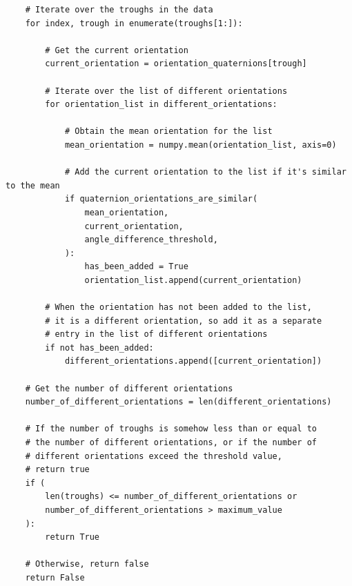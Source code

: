 \documentclass[12pt]{report}
\begin{document}
\begin{verbatim}
    # Iterate over the troughs in the data
    for index, trough in enumerate(troughs[1:]):

        # Get the current orientation
        current_orientation = orientation_quaternions[trough]

        # Iterate over the list of different orientations
        for orientation_list in different_orientations:

            # Obtain the mean orientation for the list
            mean_orientation = numpy.mean(orientation_list, axis=0)

            # Add the current orientation to the list if it's similar to the mean
            if quaternion_orientations_are_similar(
                mean_orientation,
                current_orientation,
                angle_difference_threshold,
            ):
                has_been_added = True
                orientation_list.append(current_orientation)

        # When the orientation has not been added to the list,
        # it is a different orientation, so add it as a separate
        # entry in the list of different orientations
        if not has_been_added:
            different_orientations.append([current_orientation])

    # Get the number of different orientations
    number_of_different_orientations = len(different_orientations)

    # If the number of troughs is somehow less than or equal to
    # the number of different orientations, or if the number of
    # different orientations exceed the threshold value,
    # return true
    if (
        len(troughs) <= number_of_different_orientations or
        number_of_different_orientations > maximum_value
    ):
        return True

    # Otherwise, return false
    return False
\end{verbatim}
\end{document}
